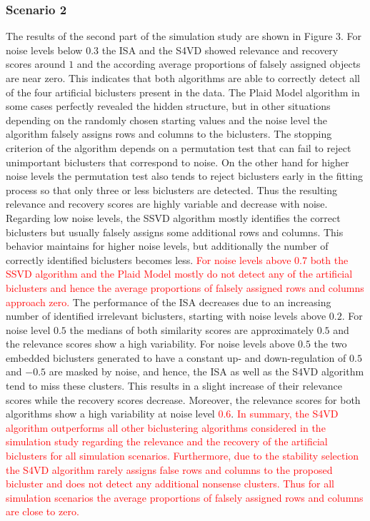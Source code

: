 \documentclass{bioinfo}
\begin{document}
\subsubsection{Scenario 2}
The results of the second part of the simulation study are shown in Figure 3. For noise levels below $0.3$ the ISA and the S4VD showed relevance and recovery scores around $1$ and the according average proportions of falsely assigned objects are near zero. This indicates that both algorithms are able to correctly detect all of the four artificial biclusters present in the data. 
The Plaid Model algorithm in some cases perfectly revealed the hidden structure, but in other situations depending on the randomly chosen starting values and the noise level the algorithm falsely assigns rows and columns to the biclusters. The stopping criterion of the algorithm depends on a permutation test that can fail to reject unimportant biclusters that correspond to noise. On the other hand for higher noise levels the permutation test also tends to reject biclusters early in the fitting process so that only three or less biclusters are detected. Thus the resulting relevance and recovery scores are highly variable and decrease with noise.
Regarding low noise levels, the SSVD algorithm mostly identifies the correct biclusters but usually falsely assigns some additional rows and columns. This behavior maintains for higher noise levels, but additionally the number of correctly identified biclusters becomes less. \textcolor{red}{For noise levels above 0.7 both the SSVD algorithm and the Plaid Model mostly do not detect any of the artificial biclusters and hence the average proportions of falsely assigned rows and columns approach zero.}
The performance of the ISA decreases due to an increasing number of identified irrelevant biclusters, starting with noise levels above $0.2$. For noise level $0.5$ the medians of both similarity scores are approximately $0.5$ and the relevance scores show a high variability. For noise levels above $0.5$ the two embedded biclusters generated to have a constant up- and down-regulation of $0.5$ and $-0.5$ are masked by noise, and hence, the ISA as well as the S4VD algorithm tend to miss these clusters. This results in a slight increase of their relevance scores while the recovery scores decrease. Moreover, the relevance scores for both algorithms show a high variability at noise level \textcolor{red}{$0.6$}. \textcolor{red}{In summary, the S4VD algorithm outperforms all other biclustering algorithms considered in the simulation study regarding the relevance and the recovery of the artificial biclusters for all simulation scenarios. Furthermore, due to the stability selection the S4VD algorithm rarely assigns false rows and columns to the proposed bicluster and does not detect any additional nonsense clusters. Thus for all simulation scenarios the average proportions of falsely assigned rows and columns are close to zero. } 
\end{document}
